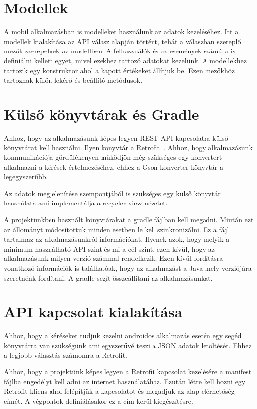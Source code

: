 \documentclass[
]{thesis-ekf}
\theoremstyle{definition}
\theoremstyle{remark}
\begin{document}
	\section{Modellek}
	A mobil alkalmazásban is modelleket használunk az adatok kezeléséhez. Itt a modellek kialakítása az API válasz alapján történt, tehát a válaszban szereplő mezők szerepelnek az modellben. A felhasználók és az események számára is definiálni kellett egyet, mivel ezekhez tartozó adatokat kezelünk. 
	A modellekhez tartozik egy konstruktor ahol a kapott értékeket állítjuk be. Ezen mezőkhöz tartoznak külön lekérő és beállító metódusok.
	
	\section{Külső könyvtárak és Gradle}
	Ahhoz, hogy az alkalmazásunk képes legyen REST API kapcsolatra külső könyvtárat kell használni. Ilyen könyvtár a Retrofit~\cite{retrofit_doc}. Ahhoz, hogy alkalmazásunk kommunikációja gördülékenyen működjön még szükséges egy konvertert alkalmazni a kérések értelmezéséhez, ehhez a Gson konverter könyvtár a legegyszerűbb. 
	
	Az adatok megjelenítése szempontjából is szükséges egy külső könyvtár használata ami implementálja a recycler view nézetet.
	
	A projektünkben használt könyvtárakat a gradle fájlban kell megadni. Miután ezt az állományt módosítottuk minden esetben le kell szinkronizálni. Ez a fájl tartalmaz az alkalmazásunkról információkat. Ilyenek azok, hogy melyik a minimum használható API szint és mi a cél szint, ezen kívül, hogy az alkalmazásunk milyen verzió számmal rendelkezik. Ezen kívül fordításra vonatkozó információk is találhatóak, hogy az alkalmazást a Java mely verziójára szeretnénk fordítani. A gradle segít összeállítani az alkalmazásunkat.
	
	\section{API kapcsolat kialakítása}
	Ahhoz, hogy a kéréseket tudjuk kezelni androidos alkalmazás esetén egy segéd könyvtárra van szükségünk ami egyszerűvé teszi a JSON adatok letöltését. Ehhez a legjobb választás számomra a Retrofit.
	
	Ahhoz, hogy a projektünk képes legyen a Retrofit kapcsolat kezelésére a manifest fájlba engedélyt kell adni az internet használatához. Ezután létre kell hozni egy Retrofit kliens ahol felépítjük a kapcsolatot és megadjuk az alap elérhetőség címét. A végpontok definiálásakor ez a cím kerül kiegészítésre. 
	
\end{document}
